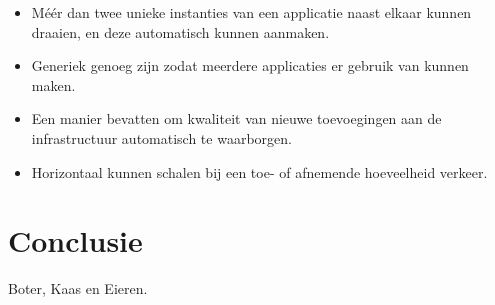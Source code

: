 \begin{itemize}
	\item Méér dan twee unieke instanties van een applicatie naast elkaar kunnen draaien, en deze automatisch kunnen aanmaken.
	\item Generiek genoeg zijn zodat meerdere applicaties er gebruik van kunnen maken.
	\item Een manier bevatten om kwaliteit van nieuwe toevoegingen aan de infrastructuur automatisch te waarborgen.
	\item Horizontaal kunnen schalen bij een toe- of afnemende hoeveelheid verkeer.
\end{itemize}

\section{Conclusie}

Boter, Kaas en Eieren.